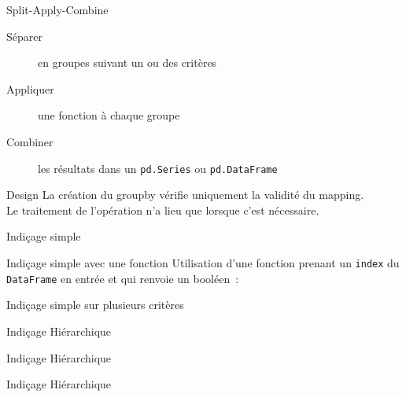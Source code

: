 \begin{frame}{Split-Apply-Combine}
  \begin{description}
    \item[Séparer]   en groupes suivant un ou des critères
    \item[Appliquer] une fonction à chaque groupe
    \item[Combiner]  les résultats dans un \texttt{pd.Series} ou \texttt{pd.DataFrame}
  \end{description}
\end{frame}

\begin{frame}{Design}
  La création du groupby vérifie uniquement la validité du mapping. \\
  Le traitement de l'opération n'a lieu que lorsque c'est nécessaire. \\
\end{frame}

\begin{frame}{Indiçage simple}
\end{frame}

\begin{frame}{Indiçage simple avec une fonction}
  Utilisation d'une fonction prenant un \texttt{index} du \texttt{DataFrame} en entrée et qui renvoie un booléen~:
\end{frame}

\begin{frame}{Indiçage simple sur plusieurs critères}
\end{frame}

\begin{frame}{Indiçage Hiérarchique}
\end{frame}

\begin{frame}{Indiçage Hiérarchique}
\end{frame}

\begin{frame}{Indiçage Hiérarchique}
\end{frame}

